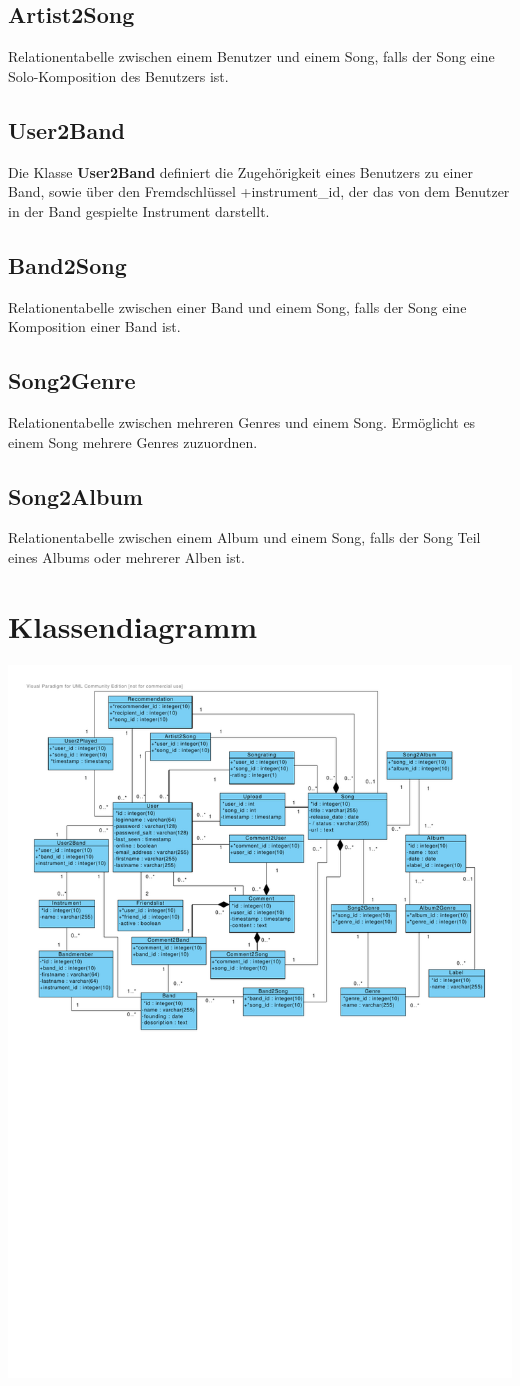 \documentclass[11pt,a4paper,DIV=9]{scrartcl}
\begin{document}
  \subsection{Artist2Song}
    Relationentabelle zwischen einem Benutzer und einem Song, falls der Song eine Solo-Komposition des Benutzers ist.
  \subsection{User2Band}
    Die Klasse \textbf{User2Band} definiert die Zugehörigkeit eines Benutzers zu einer Band, sowie über den Fremdschlüssel +instrument\_id, der das von dem Benutzer in der Band gespielte Instrument darstellt.
  \subsection{Band2Song}
    Relationentabelle zwischen einer Band und einem Song, falls der Song eine Komposition einer Band ist.
  \subsection{Song2Genre}
    Relationentabelle zwischen mehreren Genres und einem Song. Ermöglicht es einem Song mehrere Genres zuzuordnen.
  \subsection{Song2Album}
    Relationentabelle zwischen einem Album und einem Song, falls der Song Teil eines Albums oder mehrerer Alben ist.



\section{Klassendiagramm}
\includegraphics[page=1, angle=90,trim=0cm 0cm 1.1cm 1cm, clip=true, scale=1.1]{Diagram1}
\end{document}
